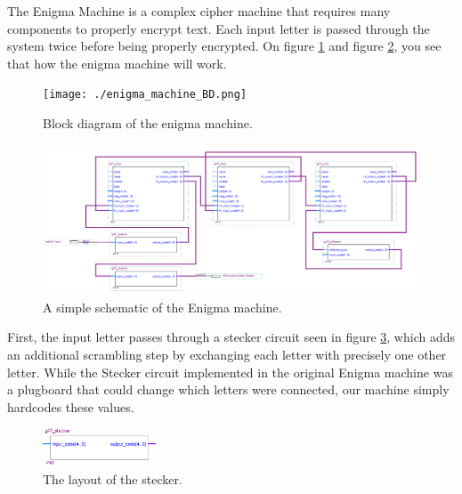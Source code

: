 \documentclass[10pt]{article}
\begin{document}
The Enigma Machine is a complex cipher machine that requires many components to properly encrypt text. Each input letter is passed through the system twice before being properly encrypted. On figure \ref{fig:enigma_machine_BD} and figure \ref{fig:Enigma_machine_sch}, you see that how the enigma machine will work.\\
\begin{figure}[!htb]
    \centering
    \texttt{[image: ./enigma\_machine\_BD.png]}
    \caption{Block diagram of the enigma machine.}
    \label{fig:enigma_machine_BD}
\end{figure}
\begin{figure}[!htb]
    \centering
    \includegraphics[width=1\textwidth]{./Enigma_machine_sch.png}
    \caption{A simple schematic of the Enigma machine.}
    \label{fig:Enigma_machine_sch}
\end{figure}
\newline
First, the input letter passes through a stecker circuit seen in figure \ref{fig:stecker_layout}, which adds an additional scrambling step by exchanging each letter with precisely one other letter. While the Stecker circuit implemented in the original Enigma machine was a plugboard that could change which letters were connected, our machine simply hardcodes these values.\\
\begin{figure}[!htb]
    \centering
    \includegraphics[width=0.3\textwidth]{./stecker_layout.png}
    \caption{The layout of the stecker.}
    \label{fig:stecker_layout}
\end{figure}
\end{document}
